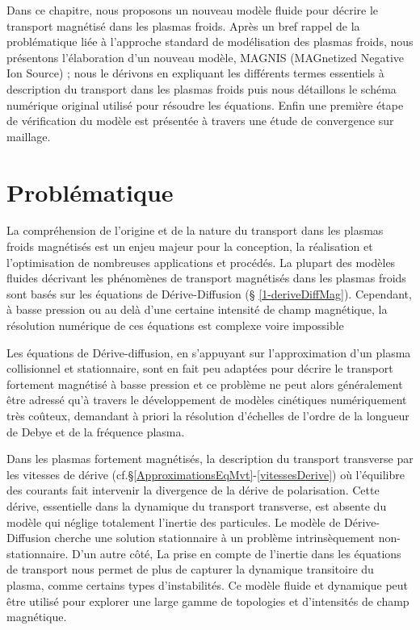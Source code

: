 \begin{refsection}


Dans ce chapitre, nous proposons un nouveau modèle fluide pour décrire le
transport magnétisé dans les plasmas froids. Après un bref rappel de
la problématique liée à l'approche standard de modélisation des plasmas froids,
nous présentons l'élaboration d'un nouveau modèle, MAGNIS (MAGnetized Negative
Ion Source) ; nous le dérivons en expliquant les différents termes
essentiels à description du transport dans les plasmas froids puis nous détaillons le
schéma numérique original utilisé pour résoudre les équations. Enfin une
première étape de vérification du modèle est présentée à travers une étude de
convergence sur maillage.

\section{Problématique}

La compréhension de l'origine et de la nature du transport dans les plasmas
froids magnétisés est un enjeu majeur pour la conception, la réalisation et
l'optimisation de nombreuses applications et procédés. La plupart des modèles
fluides décrivant les phénomènes de transport magnétisés dans les plasmas
froids sont basés sur les équations de Dérive-Diffusion (\S
\ref{1-deriveDiffMag}).
 Cependant, à basse pression ou au delà d'une
certaine intensité de champ magnétique, la résolution numérique de ces
équations est complexe voire impossible 

Les équations de Dérive-diffusion, en s'appuyant sur l'approximation d'un plasma
collisionnel et stationnaire, sont en fait peu adaptées pour décrire le
transport fortement magnétisé à basse pression et ce problème ne peut alors
généralement être adressé qu'à travers le développement de modèles cinétiques
numériquement très coûteux, demandant à priori la résolution d'échelles de
l'ordre de la longueur de Debye et de la fréquence plasma.

Dans les plasmas fortement magnétisés, la description du transport transverse
par les vitesses de dérive (cf.\S\ref{ApproximationsEqMvt}-\ref{vitessesDerive})
où l'équilibre des courants fait intervenir la divergence de la dérive de
polarisation. Cette dérive, essentielle dans la dynamique du transport
transverse, est absente du modèle qui néglige totalement l'inertie des
particules. Le modèle de Dérive-Diffusion cherche une solution stationnaire à
un problème intrinsèquement non-stationnaire.
\parencite{Fruchtman}
\parencite{Sternberg}
D'un autre côté,
  La prise en compte de l'inertie
	dans les équations de transport nous permet de plus de capturer la dynamique transitoire du plasma, comme certains types d'instabilités. Ce modèle fluide et dynamique peut être utilisé pour explorer
		une large gamme de topologies et d'intensités de champ magnétique.


\end{refsection}
